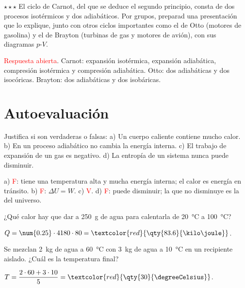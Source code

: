 \begin{exercise}
    \(\star\star\star\) El ciclo de Carnot, del que se deduce el segundo principio, consta de dos procesos isotérmicos y dos
    adiabáticos. Por grupos, preparad una presentación que lo explique, junto con otros ciclos importantes como el de Otto (motores
    de gasolina) y el de Brayton (turbinas de gas y motores de avión), con sus diagramas \(p\)-\(V\).
    \begin{solu}
        \textcolor{red}{Respuesta abierta}. Carnot: expansión isotérmica, expansión adiabática, compresión isotérmica y compresión
        adiabática. Otto: dos adiabáticas y dos isocóricas. Brayton: dos adiabáticas y dos isobáricas.
    \end{solu}
\end{exercise}

\section{Autoevaluación}\label{sec:ud13-autoevaluacion}

\begin{exercise}
    Justifica si son verdaderas o falsas: a) Un cuerpo caliente contiene mucho calor. b) En un proceso adiabático no cambia la
    energía interna. c) El trabajo de expansión de un gas es negativo. d) La entropía de un sistema nunca puede disminuir.
    \begin{solu}
        a) \textcolor{red}{F}: tiene una temperatura alta y mucha energía interna; el calor es energía en tránsito. b)
        \textcolor{red}{F}: \(\Delta U = W\). c) \textcolor{red}{V}. d) \textcolor{red}{F}: puede disminuir; la que no disminuye es la
        del universo.
    \end{solu}
\end{exercise}

\begin{exercise}
    ¿Qué calor hay que dar a \qty{250}{\g} de agua para calentarla de \qty{20}{\degreeCelsius} a \qty{100}{\degreeCelsius}?
    \begin{solu}
        \(Q = \num{0.25} \cdot 4180 \cdot 80 = \textcolor{red}{\qty{83.6}{\kilo\joule}}\).
    \end{solu}
\end{exercise}

\begin{exercise}
    Se mezclan \qty{2}{\kg} de agua a \qty{60}{\degreeCelsius} con \qty{3}{\kg} de agua a \qty{10}{\degreeCelsius} en un recipiente
    aislado. ¿Cuál es la temperatura final?
    \begin{solu}
        \(T = \dfrac{2 \cdot 60 + 3 \cdot 10}{5} = \textcolor{red}{\qty{30}{\degreeCelsius}}\).
    \end{solu}
\end{exercise}

